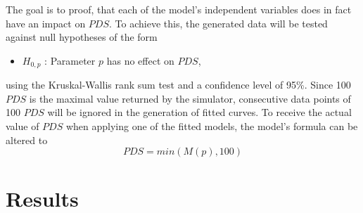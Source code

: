 \documentclass[a4paper,12pt,twoside]{report}
\begin{document}
The goal is to proof, that each of the model's independent variables does in fact have an impact on $PDS$. To achieve this, the generated data will be tested against null hypotheses of the form

\begin{itemize}
\item[] $H_{0,p}$ : Parameter $p$ has no effect on $PDS$,
\end{itemize}
using the Kruskal-Wallis rank sum test and a confidence level of 95\%. Since 100 $PDS$ is the maximal value returned by the simulator, consecutive data points of 100 $PDS$ will be ignored in the generation of fitted curves. To receive the actual value of $PDS$ when applying one of the fitted models, the model's formula can be altered to
\begin{equation}\label{min}
PDS = min(M(p), 100)
\end{equation}
\section{Results} \label{results}
\end{document}
